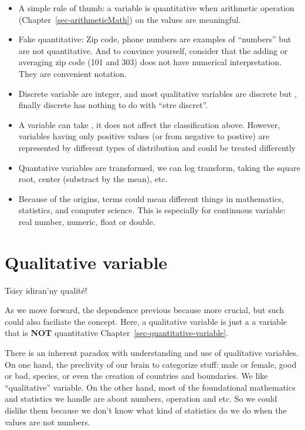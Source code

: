 \documentclass[
  letterpaper,
  DIV=11,
  numbers=noendperiod]{scrreprt}
\providecommand{\tightlist}{%
  \setlength{\itemsep}{0pt}\setlength{\parskip}{0pt}}
\begin{document}
\begin{itemize}
\tightlist
\item
  A simple rule of thumb: a variable is quantitative when arithmetic
  operation (Chapter~\ref{sec-arithmeticMath}) on the values are
  meaningful.
\item
  Fake quantitative: Zip code, phone numbers are examples of ``numbers''
  but are not quantitative. And to convince yourself, consider that the
  adding or averaging zip code (101 and 303) does not have numerical
  interpretation. They are convenient notation.
\item
  Discrete variable are integer, and most qualitative variables are
  discrete but , finally discrete has nothing to do with ``etre
  discret''.
\item
  A variable can take , it does not affect the classification above.
  However, variables having only positive values (or from negative to
  postive) are represented by different types of distribution and could
  be treated differently
\item
  Quantative variables are transformed, we can log transform, taking the
  square root, center (substract by the mean), etc.
\item
  Because of the origins, terms could mean different things in
  mathematics, statistics, and computer science. This is especially for
  continuous variable: real number, numeric, float or double.
\end{itemize}

\chapter{Qualitative variable}\label{sec-qualitative-variable}

Tsisy idiran'ny qualité!

As we move forward, the dependence previous because more crucial, but
such could also faciliate the concept. Here, a qualitative variable is
just a a variable that is \textbf{NOT} quantitative
Chapter~\ref{sec-quantitative-variable}.

There is an inherent paradox with understanding and use of qualitative
variables. On one hand, the preclivity of our brain to categorize stuff:
male or female, good or bad, species, or even the creation of countries
and boundaries. We like ``qualitative'' variable. On the other hand,
most of the foundational mathematics and statistics we handle are about
numbers, operation and etc. So we could dislike them because we don't
know what kind of statistics do we do when the values are not numbers.
\end{document}
